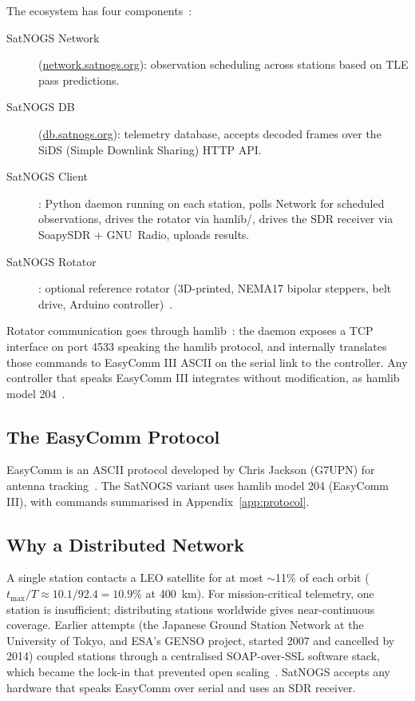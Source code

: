 The ecosystem has four components~\cite{satnogs-main, satnogs-network, satnogs-wiki, papadeas2015satnogs}:

\begin{description}
    \item[SatNOGS Network] (\url{network.satnogs.org}): observation scheduling across stations based on TLE pass predictions.
    \item[SatNOGS DB] (\url{db.satnogs.org}): telemetry database, accepts decoded frames over the SiDS (Simple Downlink Sharing) HTTP API.
    \item[SatNOGS Client]: Python daemon running on each station, polls Network for scheduled observations, drives the rotator via hamlib/, drives the SDR receiver via SoapySDR + GNU~Radio, uploads results.
    \item[SatNOGS Rotator]: optional reference rotator (3D-printed, NEMA17 bipolar steppers, belt drive, Arduino controller)~\cite{satnogs-rotator-fw}.
\end{description}

Rotator communication goes through hamlib~\cite{hamlib}: the  daemon exposes a TCP interface on port 4533 speaking the hamlib  protocol, and internally translates those commands to EasyComm III ASCII on the serial link to the controller. Any controller that speaks EasyComm III integrates without modification, as hamlib model 204~\cite{jackson1990easycomm}.

\subsection{The EasyComm Protocol}

EasyComm is an ASCII protocol developed by Chris Jackson (G7UPN) for antenna tracking~\cite{jackson1990easycomm}. The SatNOGS variant uses hamlib model 204 (EasyComm III), with commands summarised in Appendix~\ref{app:protocol}.

\subsection{Why a Distributed Network}

A single station contacts a LEO satellite for at most $\sim$11\% of each orbit ($t_{\max}/T \approx 10.1/92.4 = 10.9\%$ at 400~km). For mission-critical telemetry, one station is insufficient; distributing stations worldwide gives near-continuous coverage. Earlier attempts (the Japanese Ground Station Network at the University of Tokyo, and ESA's GENSO project, started 2007 and cancelled by 2014) coupled stations through a centralised SOAP-over-SSL software stack, which became the lock-in that prevented open scaling~\cite{hanssens2023}. SatNOGS accepts any hardware that speaks EasyComm over serial and uses an SDR receiver.

